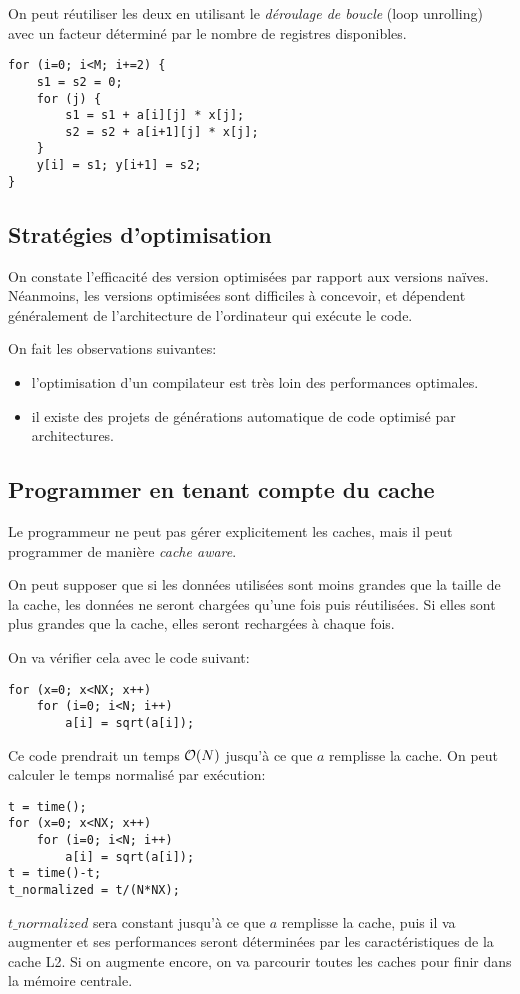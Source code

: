On peut réutiliser les deux en utilisant le \textit{déroulage de boucle} (loop unrolling) avec un facteur déterminé par le nombre de registres disponibles.

\begin{verbatim}
for (i=0; i<M; i+=2) {
    s1 = s2 = 0;
    for (j) {
        s1 = s1 + a[i][j] * x[j];
        s2 = s2 + a[i+1][j] * x[j];
    }
    y[i] = s1; y[i+1] = s2;
}
\end{verbatim}

	\subsection{Stratégies d'optimisation}


On constate l'efficacité des version optimisées par rapport aux versions naïves. Néanmoins, les versions optimisées sont difficiles à concevoir, et dépendent généralement de l'architecture de l'ordinateur qui exécute le code.

On fait les observations suivantes:
\begin{itemize}
\item l'optimisation d'un compilateur est très loin des performances optimales.
\item il existe des projets de générations automatique de code optimisé par architectures.
\end{itemize}
	
	\subsection{Programmer en tenant compte du cache}
	
Le programmeur ne peut pas gérer explicitement les caches, mais il peut programmer de manière \textit{cache aware}.

On peut supposer que si les données utilisées sont moins grandes que la taille de la cache, les données ne seront chargées qu'une fois puis réutilisées. Si elles sont plus grandes que la cache, elles seront rechargées à chaque fois.

On va vérifier cela avec le code suivant:
\begin{verbatim}
for (x=0; x<NX; x++)
    for (i=0; i<N; i++)
        a[i] = sqrt(a[i]);
\end{verbatim}
Ce code prendrait un temps $\mathcal{O}(N)$ jusqu'à ce que $a$ remplisse la cache. On peut calculer le temps normalisé par exécution:
\begin{verbatim}
t = time();
for (x=0; x<NX; x++)
    for (i=0; i<N; i++)
        a[i] = sqrt(a[i]);
t = time()-t;
t_normalized = t/(N*NX);
\end{verbatim}
$t\_normalized$ sera constant jusqu'à ce que $a$ remplisse la cache, puis il va augmenter et ses performances seront déterminées par les caractéristiques de la cache L2. Si on augmente encore, on va parcourir toutes les caches pour finir dans la mémoire centrale.

